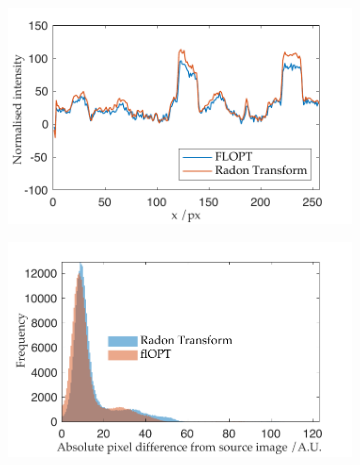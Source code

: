 \documentclass{osa-article}
\begin{document}
\begin{figure}
  \centering
  \begin{subfigure}[t]{0.45\textwidth}
    \centering
    \includegraphics[width=\textwidth]{./figures/results/comparison_line_profile}
    \caption{}\label{fig:flopt_comparison_line_profile}
  \end{subfigure}\quad
 \begin{subfigure}[t]{0.45\textwidth}
    \centering
    \includegraphics[width=\textwidth]{./figures/results/flopt_histogram}

\end{subfigure}
\end{figure}
\end{document}
